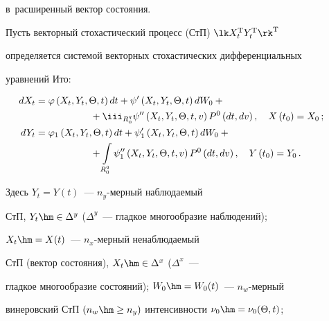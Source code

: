 в~расширенный вектор состояния.






Пусть векторный стохастический процесс (СтП) $\lk X_t^{\mathrm{T}} Y_t^{\mathrm{T}} \rk^{\mathrm{T}}$

определяется системой векторных стохастических дифференциальных

уравнений Ито:



\noindent

    \begin{align}

    \hspace*{-20mm}dX_t &=\varphi \left(X_t,Y_t,\Theta, t\right) dt + \psi' 

    \left(X_t,Y_t,\Theta, t\right) dW_0 + {}\notag\\

&       \hspace*{20mm} {}+\iii_{R_0^q} \psi''

    \left(X_t,Y_t,\Theta, t,v\right) P^0\, (dt, dv)\,,\quad 

    X\left(t_0\right) = X_0\,;\label{e2.1-s1}\\

    \hspace*{-20mm}dY_t &=\varphi_1 \left(X_t,Y_t,\Theta, t\right) dt +

    \psi_1' \left(X_t,Y_t,\Theta, t\right) dW_0 + {}\notag\\

       & \hspace*{20mm}{}+    \int\limits_{R_0^q} \psi_1'' \left(X_t,Y_t,\Theta, t,v\right) P^0

\,    (dt,dv)\,,\quad Y\left(t_0\right) = Y_0\,.\label{e2.2-s1}

\end{align}

Здесь $Y_t=Y(t)$~--- $n_y$-мер\-ный наблюдаемый

СтП, $Y_t\hm \in \Delta^y$ ($\Delta^y$~--- гладкое многообразие наблюдений); 

$X_t \hm=X(t)$~--- $n_x$-мер\-ный ненаблюдаемый

СтП (вектор состояния), $X_t \hm\in \Delta^x$ ($\Delta^x$~--- 

гладкое многообразие состояний); $W_0 \hm=W_0(t)$~--- $n_w$-мер\-ный

винеровский СтП $(n_w\hm\ge n_y)$ интенсивности  $\nu_0\hm =\nu_0 (\Theta, t)$; 

